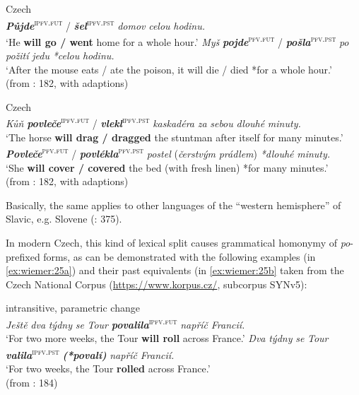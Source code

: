 \documentclass[output=paper,colorlinks,citecolor=brown]{langscibook}
\begin{document}
\ea \label{ex:wiemer:23} Czech\\
    \ea \label{ex:wiemer:23a}
    \textit{\textbf{Půjde}}\textsuperscript{\textsc{ipfv.fut}} / \textit{\textbf{šel}}\textsuperscript{\textsc{ipfv.pst}} \textit{domov} \textit{celou} \textit{hodinu.}\\
    ‘He \textbf{will go / went} home for a whole hour.’
    \ex \label{ex:wiemer:23b}
    \textit{Myš} \textit{\textbf{pojde}}\textsuperscript{\textsc{pfv.fut}} / \textit{\textbf{pošla}}\textsuperscript{\textsc{pfv.pst}} \textit{po} \textit{požití} \textit{jedu} \textit{*celou} \textit{hodinu.}\\
    ‘After the mouse eats / ate the poison, it will die / died *for a whole hour.’\\
    \hfill (from \cite{ŠevčíkováPanevová2018}: 182, with adaptions)
    \z
\z

\ea \label{ex:wiemer:24} Czech\\
    \ea \label{ex:wiemer:24a}
    \textit{Kůň} \textit{\textbf{povleče}}\textsuperscript{\textsc{ipfv.fut}} / \textit{\textbf{vlekl}}\textsuperscript{\textsc{ipfv.pst}} \textit{kaskadéra} \textit{za} \textit{sebou} \textit{dlouhé} \textit{minuty.}\\
    ‘The horse \textbf{will drag / dragged} the stuntman after itself for many minutes.’
    \ex \label{ex:wiemer:24b}
    \textit{\textbf{Povleče}}\textsuperscript{\textsc{pfv.fut}} / \textit{\textbf{povlékla}}\textsuperscript{\textsc{pfv.pst}} \textit{postel} (\textit{čerstvým} \textit{prádlem}) \textit{*dlouhé} \textit{minuty.}\\
    ‘She \textbf{will cover / covered} the bed (with fresh linen) *for many minutes.’\\
    \hfill (from \cite{ŠevčíkováPanevová2018}: 182, with adaptions)
    \z
\z


Basically, the same applies to other languages of the “western hemisphere” of Slavic, e.g. Slovene (\cite{dickey_2018}: 375). 

In modern Czech, this kind of lexical split causes grammatical homonymy of \textit{po}-prefixed forms, as can be demonstrated with the following examples (in \ref{ex:wiemer:25a}) and their past equivalents (in \ref{ex:wiemer:25b} taken from the Czech National Corpus (\href{https://www.korpus.cz/}{https://www.korpus.cz/}, subcorpus SYNv5):

\ea \label{ex:wiemer:25} intransitive, parametric change\\
    \ea \label{ex:wiemer:25a} 
    \textit{Ještě} \textit{dva} \textit{týdny} \textit{se} \textit{Tour} \textit{\textbf{povalila}}\textsuperscript{\textsc{ipfv.fut}} \textit{napříč} \textit{Francií.}\\
    ‘For two more weeks, the Tour \textbf{will roll} across France.’
    \ex \label{ex:wiemer:25b}
    \textit{Dva} \textit{týdny} \textit{se} \textit{Tour} \textit{\textbf{valila}}\textsuperscript{\textsc{ipfv.pst}} \textit{\textbf{(*povalí)}} \textit{napříč} \textit{Francií.}\\
    ‘For two weeks, the Tour \textbf{rolled} across France.’\\
    \hfill (from \cite{ŠevčíkováPanevová2018}: 184)
    \z
\z
\end{document}
